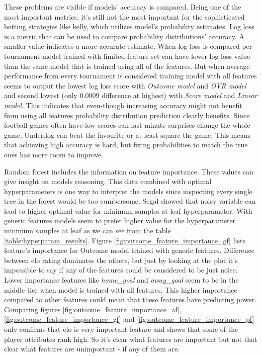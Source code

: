 These problems are visible if models' accuracy is compared. Being one of the most important metrics, it's still not the most important for the sophisticated betting strategies like kelly, which utilizes model's probability estimates. Log loss
is a metric that can be used to compare probability distributions' accuracy. A smaller value indicates a more accurate estimate. When log loss is compared per tournament model trained with limited feature set can have lower log loss value than the same model that is trained using all of the features. But when average performance from every tournament is considered training model with all features seems to output the lowest log loss score with \textit{Outcome model} and \textit{OVR model} and second lowest (only 0.0009 difference at highest) with \textit{Score model} and \textit{Linear model}. This indicates that even-though increasing accuracy might not benefit from using all features probability distribution prediction clearly benefits. Since football games often have low scores can last minute surprises change the whole game. Underdog can beat the favourite or at least square the game. This means that achieving high accuracy is hard, but fixing probabilities to match the true ones has more room to improve.

Random forest includes the information on feature importance. These values can give insight on models reasoning. This data combined with optimal hyperparameters is one way to interpret the models since inspecting every single tree in the forest would be too cumbersome. Segal \cite{segal2004machine} showed that noisy variable can lead to higher optimal value for minimum samples at leaf hyperparameter. With generic features models seem to prefer higher value for the hyperparameter minimum samples at leaf as we can see from the table \ref{table:hyperparam_results}.  Figure \ref{fig:outcome_feature_importance_gf} lists feature's importance for Outcome model trained with generic features. Difference between elo rating dominates the others, but just by looking at the plot it's impossible to say if any of the features could be considered to be just noise. Lower importance features like \textit{home\_goal} and \textit{away\_goal} seem to be in the middle tier when model is trained with all features. This higher importance compared to other features could mean that these features have predicting power. Comparing figures \ref{fig:outcome_feature_importance_af}, \ref{fig:outcome_feature_importance_gf} and \ref{fig:outcome_feature_importance_pf} only confirms that elo is very important feature and shows that some of the player attributes rank high. So it's clear what features are important but not that clear what features are unimportant - if any of them are.

